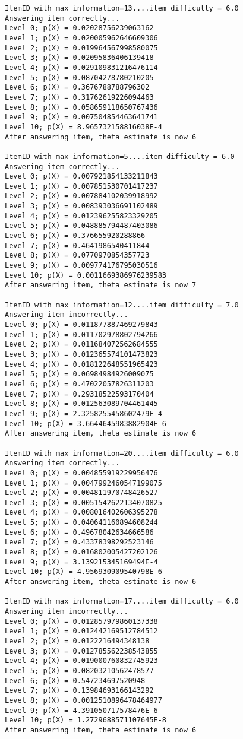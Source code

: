 \begin{verbatim}
ItemID with max information=13....item difficulty = 6.0
Answering item correctly...
Level 0; p(X) = 0.02028756239063162
Level 1; p(X) = 0.020005962646609306
Level 2; p(X) = 0.019964567998580075
Level 3; p(X) = 0.02095836406139418
Level 4; p(X) = 0.029109831216476114
Level 5; p(X) = 0.08704278780210205
Level 6; p(X) = 0.3676788788796302
Level 7; p(X) = 0.31762619226094463
Level 8; p(X) = 0.058659118650767436
Level 9; p(X) = 0.007504854463641741
Level 10; p(X) = 8.965732158816038E-4
After answering item, theta estimate is now 6

ItemID with max information=5....item difficulty = 6.0
Answering item correctly...
Level 0; p(X) = 0.007921854133211843
Level 1; p(X) = 0.007851530701417237
Level 2; p(X) = 0.007884102039918992
Level 3; p(X) = 0.008393036691102489
Level 4; p(X) = 0.012396255823329205
Level 5; p(X) = 0.048885794487403086
Level 6; p(X) = 0.376655920288866
Level 7; p(X) = 0.4641986540411844
Level 8; p(X) = 0.0770970854357723
Level 9; p(X) = 0.009774176795030516
Level 10; p(X) = 0.0011669386976239583
After answering item, theta estimate is now 7

ItemID with max information=12....item difficulty = 7.0
Answering item incorrectly...
Level 0; p(X) = 0.011877887469279843
Level 1; p(X) = 0.011702978802794266
Level 2; p(X) = 0.011684072562684555
Level 3; p(X) = 0.012365574101473823
Level 4; p(X) = 0.018122648551965423
Level 5; p(X) = 0.06984984926009075
Level 6; p(X) = 0.47022057826311203
Level 7; p(X) = 0.29318522593170404
Level 8; p(X) = 0.012563089704461445
Level 9; p(X) = 2.3258255458602479E-4
Level 10; p(X) = 3.6644645983882904E-6
After answering item, theta estimate is now 6

ItemID with max information=20....item difficulty = 6.0
Answering item correctly...
Level 0; p(X) = 0.004855919229956476
Level 1; p(X) = 0.0047992460547199075
Level 2; p(X) = 0.004811970748426527
Level 3; p(X) = 0.0051542622134070825
Level 4; p(X) = 0.008016402606395278
Level 5; p(X) = 0.040641160894608244
Level 6; p(X) = 0.49678042634666586
Level 7; p(X) = 0.43378398292523146
Level 8; p(X) = 0.016802005427202126
Level 9; p(X) = 3.139215345169494E-4
Level 10; p(X) = 4.956930909540798E-6
After answering item, theta estimate is now 6

ItemID with max information=17....item difficulty = 6.0
Answering item incorrectly...
Level 0; p(X) = 0.012857979860137338
Level 1; p(X) = 0.012442169512784512
Level 2; p(X) = 0.0122216494348138
Level 3; p(X) = 0.012785562238543855
Level 4; p(X) = 0.019000760832745923
Level 5; p(X) = 0.08203210562478577
Level 6; p(X) = 0.547234697520948
Level 7; p(X) = 0.13984693166143292
Level 8; p(X) = 0.0012510896478464977
Level 9; p(X) = 4.391050717578476E-6
Level 10; p(X) = 1.2729688571107645E-8
After answering item, theta estimate is now 6


\end{verbatim}
